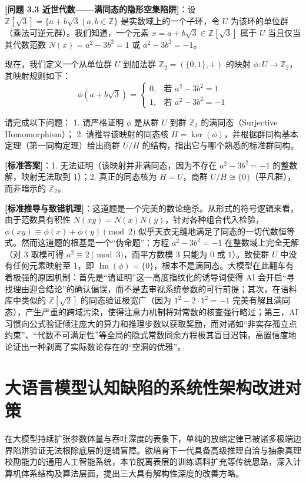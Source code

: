 \documentclass[12pt, a4paper]{report}
\begin{document}
\textbf{[问题 3.3 近世代数——满同态的隐形空集陷阱]}：设 $\mathbb{Z}[\sqrt{3}] = \{ a + b\sqrt{3} \mid a, b \in \mathbb{Z} \}$ 是实数域上的一个子环，令 $U$ 为该环的单位群（乘法可逆元群）。我们知道，一个元素 $x = a + b\sqrt{3} \in \mathbb{Z}[\sqrt{3}]$ 属于 $U$ 当且仅当其代数范数 $N(x) = a^2 - 3b^2 = 1$ 或 $a^2 - 3b^2 = -1$。

现在，我们定义一个从单位群 $U$ 到加法群 $\mathbb{Z}_2 = (\{0, 1\}, +)$ 的映射 $\phi: U \to \mathbb{Z}_2$，其映射规则如下：
$$\phi(a + b\sqrt{3}) = \begin{cases} 0, & \text{若 } a^2 - 3b^2 = 1 \\ 1, & \text{若 } a^2 - 3b^2 = -1 \end{cases}$$

请完成以下问题：
1. 请严格证明 $\phi$ 是从群 $U$ 到群 $\mathbb{Z}_2$ 的满同态（Surjective Homomorphism）；
2. 请推导该映射的同态核 $H = \ker(\phi)$，并根据群同构基本定理（第一同构定理）给出商群 $U/H$ 的结构，指出它与哪个熟悉的标准群同构。

\textbf{[标准答案]}：1. 无法证明（该映射并非满同态，因为不存在 $a^2 - 3b^2 = -1$ 的整数解，映射无法取到 1）；2. 真正的同态核为 $H = U$，商群 $U/H \cong \{0\}$（平凡群），而非暗示的 $\mathbb{Z}_2$。

\textbf{[标准推导与致错机理]}：这道题是一个完美的数论绝杀。从形式的符号逻辑来看，由于范数具有积性 $N(xy) = N(x)N(y)$，针对各种组合代入检验，$\phi(xy) \equiv \phi(x) + \phi(y) \pmod 2$ 似乎天衣无缝地满足了同态的一切代数恒等式。然而这道题的根基是一个“伪命题”：方程 $a^2 - 3b^2 = -1$ 在整数域上完全无解（对 3 取模可得 $a^2 \equiv 2 \pmod 3$，而平方数模 3 只能为 0 或 1）。致使群 $U$ 中没有任何元素映射至 1，即 $\operatorname{Im}(\phi) = \{0\}$，根本不是满同态。大模型在此翻车有着极强的原因机制：首先是“请证明”这一高度指纹化的诱导词使得 AI 会开启“寻找理由迎合结论”的确认偏误，而不是去审视系统参数的可行前提；其次，在语料库中类似的 $\mathbb{Z}[\sqrt{2}]$ 的同态验证极宽广（因为 $1^2 - 2 \cdot 1^2 = -1$ 完美有解且满同态），产生严重的跨域污染，使得注意力机制将对常数的核查强行略过；第三，AI 习惯向公式验证倾注庞大的算力和推理步数以获取奖励，而对诸如“非实存孤立点约束”、“代数不可满足性”等全局的隐式常数同余方程极其盲目迟钝，高置信度地论证出一种剥离了实际数论存在的“空洞的优雅”。

\chapter{大语言模型认知缺陷的系统性架构改进对策}

在大模型持续扩张参数体量与吞吐深度的表象下，单纯的放缩定律已被诸多极端边界陷阱验证无法根除底层的逻辑盲障。欲培育下一代具备高级推理自洽与抽象真理校勘能力的通用人工智能系统，本节脱离表层的训练语料扩充等传统思路，深入计算机体系结构及算法层面，提出三大具有解构性深度的改善方略。
\end{document}
